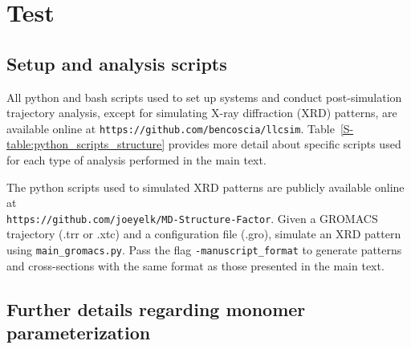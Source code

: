 \chapter{Test}

  \section{Setup and analysis scripts}\label{S-section:python_scripts_structure}
  
  All python and bash scripts used to set up systems and conduct post-simulation trajectory
  analysis, except for simulating X-ray diffraction (XRD) patterns, are available online at
  \texttt{https://github.com/bencoscia/llcsim}. Table~\ref{S-table:python_scripts_structure} provides more 
  detail about specific scripts used for each type of analysis performed in the main text.
  
  The python scripts used to simulated XRD patterns are publicly available online at \\
  \texttt{https://github.com/joeyelk/MD-Structure-Factor}. Given a GROMACS trajectory 
  (.trr or .xtc) and a configuration file (.gro), simulate an XRD pattern using
  \texttt{main\_gromacs.py}. Pass the flag \texttt{\--manuscript\_format} to generate patterns
  and cross-sections with the same format as those presented in the main text.

  \section{Further details regarding monomer parameterization}\label{S-section:parameterization}
 
